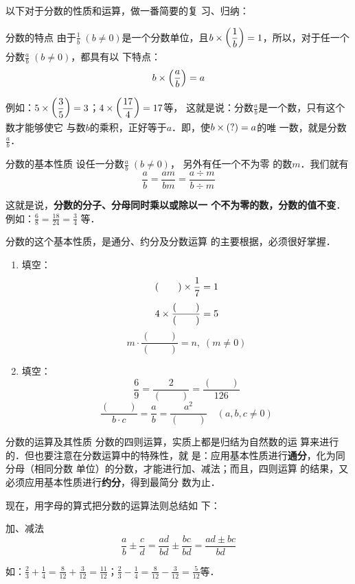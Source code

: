 以下对于分数的性质和运算，做一番简要的复
习、归纳：
\begin{blk}{分数的特点}
	由于$\frac{1}{b}\; (b\ne 0)$是一个分数单位，且$b\times\left(\dfrac{1}{b}\right)=1$，所以，对于任一个分数$\frac{a}{b}\; (b\ne 0)$，都具有以
	下特点：
	\[b\times\left(\dfrac{a}{b}\right)=a \]
\end{blk}

例如：$5\times\left(\dfrac{3}{5}\right)=3$；$4\times\left(\dfrac{17}{4}\right)=17$等，
这就是说：分数$\frac{a}{b}$是一个数，只有这个数才能够使它
与数$b$的乘积，正好等于$a$．即，使$b\times(?)=a$的唯
一数，就是分数$\frac{a}{b}$．

\begin{blk}{分数的基本性质}
	设任一分数$\frac{a}{b}\; (b\ne 0)$，
	另外有任一个不为零
	的数$m$．我们就有
	\[\frac{a}{b}=\frac{am}{bm}=\frac{a\div m}{b\div m} \]
\end{blk}

这就是说，\textbf{分数的分子、分母同时乘以或除以一
	个不为零的数，分数的值不变}．例如：$\frac{6}{8}=\frac{18}{24}=\frac{3}{4}$
等．

分数的这个基本性质，是通分、约分及分数运算
的主要根据，必须很好掌握．

\begin{ex}
	\begin{enumerate}
		\item 填空：\[(\qquad )\times \dfrac{1}{7}=1 \]\[4\times\dfrac{(\qquad)}{(\qquad )}=5\]\[m\cdot \frac{(\qquad)}{(\qquad )}=n,\; (m\ne 0)\]
		\item 填空：\[\frac{6}{9}=\frac{2}{(\qquad)}=\frac{(\qquad)}{126}\]\[\frac{(\qquad )}{b\cdot c}=\frac{a}{b}=\frac{a^2}{(\qquad )}\quad (a,b,c\ne 0)\]
	\end{enumerate}
\end{ex}


\begin{blk}{分数的运算及其性质}
	分数的四则运算，实质上都是归结为自然数的运
	算来进行的．但也要注意在分数运算中的特殊性，就
	是：应用基本性质进行\textbf{通分}，化为同分母（相同分数
	单位）的分数，才能进行加、减法；而且，四则运算
	的结果，又必须应用基本性质进行\textbf{约分}，得到最简分
	数为止．
\end{blk}


现在，用字母的算式把分数的运算法则总结如
下：

\begin{blk}{加、减法}
	\[\frac{a}{b}\pm\frac{c}{d}=\frac{ad}{bd}\pm\frac{bc}{bd}=\frac{ad\pm bc}{bd} \]
\end{blk}

如：$\frac{2}{3}+\frac{1}{4}=\frac{8}{12}+\frac{3}{12}=\frac{11}{12}$；$\frac{2}{3}-\frac{1}{4}=\frac{8}{12}-\frac{3}{12}=\frac{5}{12}$等．

